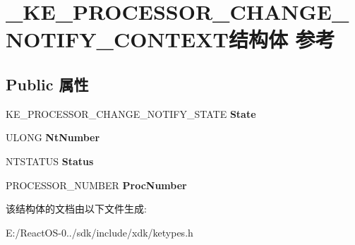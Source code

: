 \hypertarget{struct___k_e___p_r_o_c_e_s_s_o_r___c_h_a_n_g_e___n_o_t_i_f_y___c_o_n_t_e_x_t}{}\section{\+\_\+\+K\+E\+\_\+\+P\+R\+O\+C\+E\+S\+S\+O\+R\+\_\+\+C\+H\+A\+N\+G\+E\+\_\+\+N\+O\+T\+I\+F\+Y\+\_\+\+C\+O\+N\+T\+E\+X\+T结构体 参考}
\label{struct___k_e___p_r_o_c_e_s_s_o_r___c_h_a_n_g_e___n_o_t_i_f_y___c_o_n_t_e_x_t}
\subsection*{Public 属性}
\begin{DoxyCompactItemize}
\item 
\mbox{\label{struct___k_e___p_r_o_c_e_s_s_o_r___c_h_a_n_g_e___n_o_t_i_f_y___c_o_n_t_e_x_t_a4dcfb169668f83b4dcdbe1f409710572}} 
K\+E\+\_\+\+P\+R\+O\+C\+E\+S\+S\+O\+R\+\_\+\+C\+H\+A\+N\+G\+E\+\_\+\+N\+O\+T\+I\+F\+Y\+\_\+\+S\+T\+A\+TE {\bfseries State}
\item 
\mbox{\label{struct___k_e___p_r_o_c_e_s_s_o_r___c_h_a_n_g_e___n_o_t_i_f_y___c_o_n_t_e_x_t_ad99ed3c1bd122c3c2eb1f92288aba55f}} 
U\+L\+O\+NG {\bfseries Nt\+Number}
\item 
\mbox{\label{struct___k_e___p_r_o_c_e_s_s_o_r___c_h_a_n_g_e___n_o_t_i_f_y___c_o_n_t_e_x_t_a172ac78afc7ca5c6a1efb383dca74ec1}} 
N\+T\+S\+T\+A\+T\+US {\bfseries Status}
\item 
\mbox{\label{struct___k_e___p_r_o_c_e_s_s_o_r___c_h_a_n_g_e___n_o_t_i_f_y___c_o_n_t_e_x_t_a0d91a3e8903bf8e8d2aec6cc99bc92fe}} 
P\+R\+O\+C\+E\+S\+S\+O\+R\+\_\+\+N\+U\+M\+B\+ER {\bfseries Proc\+Number}
\end{DoxyCompactItemize}


该结构体的文档由以下文件生成\+:\begin{DoxyCompactItemize}
\item 
E\+:/\+React\+O\+S-\/0../sdk/include/xdk/ketypes.\+h\end{DoxyCompactItemize}
